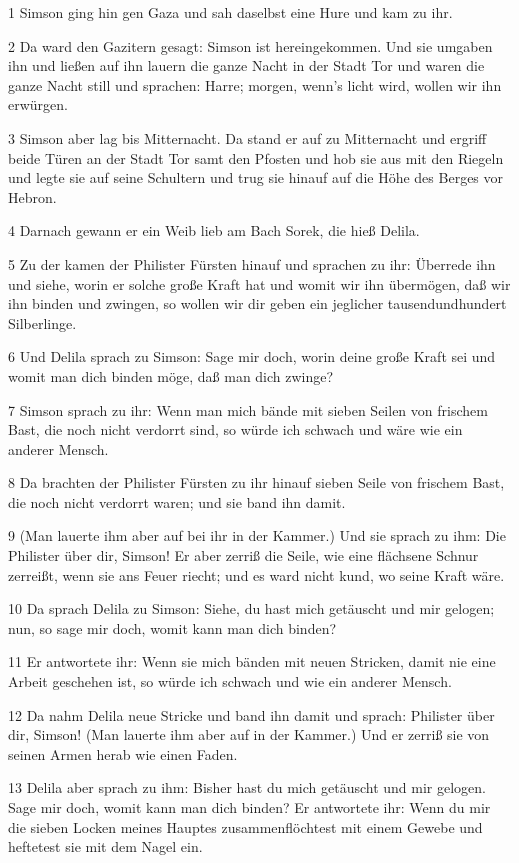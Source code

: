 \par 1 Simson ging hin gen Gaza und sah daselbst eine Hure und kam zu ihr.
\par 2 Da ward den Gazitern gesagt: Simson ist hereingekommen. Und sie umgaben ihn und ließen auf ihn lauern die ganze Nacht in der Stadt Tor und waren die ganze Nacht still und sprachen: Harre; morgen, wenn's licht wird, wollen wir ihn erwürgen.
\par 3 Simson aber lag bis Mitternacht. Da stand er auf zu Mitternacht und ergriff beide Türen an der Stadt Tor samt den Pfosten und hob sie aus mit den Riegeln und legte sie auf seine Schultern und trug sie hinauf auf die Höhe des Berges vor Hebron.
\par 4 Darnach gewann er ein Weib lieb am Bach Sorek, die hieß Delila.
\par 5 Zu der kamen der Philister Fürsten hinauf und sprachen zu ihr: Überrede ihn und siehe, worin er solche große Kraft hat und womit wir ihn übermögen, daß wir ihn binden und zwingen, so wollen wir dir geben ein jeglicher tausendundhundert Silberlinge.
\par 6 Und Delila sprach zu Simson: Sage mir doch, worin deine große Kraft sei und womit man dich binden möge, daß man dich zwinge?
\par 7 Simson sprach zu ihr: Wenn man mich bände mit sieben Seilen von frischem Bast, die noch nicht verdorrt sind, so würde ich schwach und wäre wie ein anderer Mensch.
\par 8 Da brachten der Philister Fürsten zu ihr hinauf sieben Seile von frischem Bast, die noch nicht verdorrt waren; und sie band ihn damit.
\par 9 (Man lauerte ihm aber auf bei ihr in der Kammer.) Und sie sprach zu ihm: Die Philister über dir, Simson! Er aber zerriß die Seile, wie eine flächsene Schnur zerreißt, wenn sie ans Feuer riecht; und es ward nicht kund, wo seine Kraft wäre.
\par 10 Da sprach Delila zu Simson: Siehe, du hast mich getäuscht und mir gelogen; nun, so sage mir doch, womit kann man dich binden?
\par 11 Er antwortete ihr: Wenn sie mich bänden mit neuen Stricken, damit nie eine Arbeit geschehen ist, so würde ich schwach und wie ein anderer Mensch.
\par 12 Da nahm Delila neue Stricke und band ihn damit und sprach: Philister über dir, Simson! (Man lauerte ihm aber auf in der Kammer.) Und er zerriß sie von seinen Armen herab wie einen Faden.
\par 13 Delila aber sprach zu ihm: Bisher hast du mich getäuscht und mir gelogen. Sage mir doch, womit kann man dich binden? Er antwortete ihr: Wenn du mir die sieben Locken meines Hauptes zusammenflöchtest mit einem Gewebe und heftetest sie mit dem Nagel ein.
